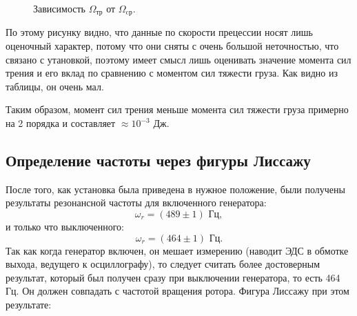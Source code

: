 \documentclass[a4paper, 12pt]{article}%
\begin{document}
\begin{figure}[h!]
\caption{Зависимость $\Omega_{\text{тр}}$ от $\Omega_{\text{cр}}$.}
\end{figure}

По этому рисунку видно, что данные по скорости прецессии носят лишь оценочный характер, потому что они сняты с очень большой неточностью, что связано с утановкой, поэтому имеет смысл лишь оценивать значение момента сил трения и его вклад по сравнению с моментом сил тяжести груза. Как видно из таблицы, он очень мал.

\begin{table}[h]
\end{table}

Таким образом, момент сил трения меньше момента сил тяжести груза примерно на 2 порядка и составляет $\approx 10^{-3} \text{ Дж}$.
\subsection{Определение частоты через фигуры Лиссажу}
После того, как установка была приведена в нужное положение, были получены результаты резонансной частоты для включенного генератора:
\[\omega_r=(489\pm 1) \text{ Гц},\] 
и только что выключенного:
\[\omega_r=(464\pm 1) \text{ Гц}.\]
Так как когда генератор включен, он мешает измерению (наводит ЭДС в обмотке выхода, ведущего к осциллографу), то следует считать более достоверным результат, который был получен сразу при выключении генератора, то есть 464 Гц. Он должен совпадать с частотой вращения ротора. Фигура Лиссажу при этом результате:
\end{document}

